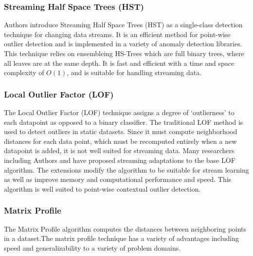 \subsubsection{Streaming Half Space Trees (HST)}
Authors \cite{fast-anomaly-detection-streaming} introduce Streaming Half Space Trees (HST) as a single-class detection technique for changing data streams. It is an efficient method for point-wise outlier detection and is implemented in a variety of anomaly detection libraries. This technique relies on ensembleing HS-Trees which are full binary trees, where all leaves are at the same depth. It is fast and efficient with a time and space complexity of $O(1)$, and is suitable for handling streaming data.



\subsubsection{Local Outlier Factor (LOF)}

The Local Outlier Factor (LOF) technique assigns a degree of `outlierness' to each datapoint as opposed to a binary classifier. The traditional LOF method is used to detect outliers in static datasets. Since it must compute neighborhood distances for each data point, which must be recomputed entirely when a new datapoint is added, it is not well suited for streaming data. Many researchers including Authors \cite{dilof-data-streams} and \cite{fast-memory-efficent-lof-milof} have proposed streaming adaptations to the base LOF algorithm. The extensions modify the algorithm to be suitable for stream learning as well as improve memory and computational performance and speed. This algorithm is well suited to point-wise contextual outlier detection.

\subsubsection{Matrix Profile} %
\label{ref_matrix-profile-alg}
The Matrix Profile algorithm computes the distances between neighboring points in a dataset.The matrix profile technique has a variety of advantages including speed and generalizability to a variety of problem domains. 

